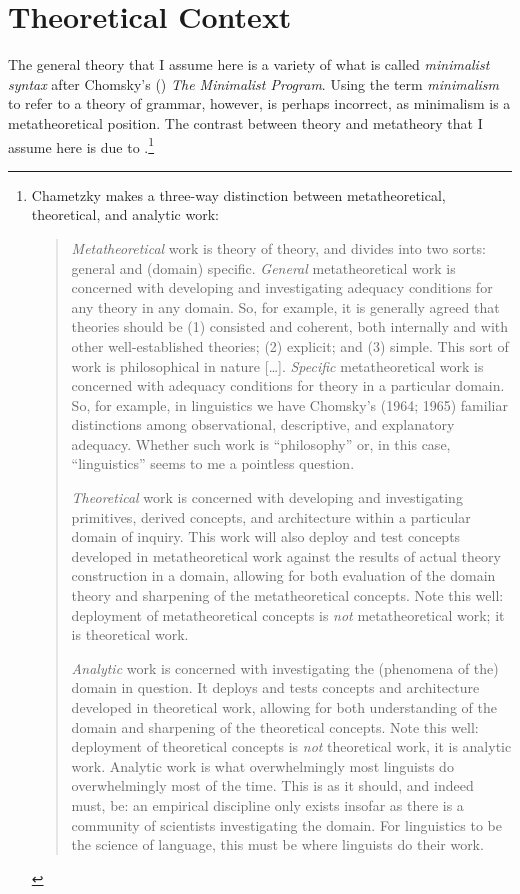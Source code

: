 \documentclass[MilwayThesis]{subfiles}
\begin{document}
\section{Theoretical Context}\label{sec:standard}
The general theory that I assume here is a variety of what is called \textit{minimalist syntax} after Chomsky's (\citeyear{chomsky1995minimalist}) \textit{The Minimalist Program}.
Using the term \textit{minimalism} to refer to a theory of grammar, however, is perhaps incorrect, as minimalism is a metatheoretical position.
The contrast between theory and metatheory that I assume here is due to \textcite{chametzky1996theory}.\footnote{
	Chametzky makes a three-way distinction between metatheoretical, theoretical, and analytic work:
	\begin{quote}
		\textit{Metatheoretical} work is theory of theory, and divides into two sorts: general and (domain) specific.
		\textit{General} metatheoretical work is concerned with developing and investigating adequacy conditions for any theory in any domain.
		So, for example, it is generally agreed that theories should be (1) consisted and coherent, both internally and with other well-established theories; (2) explicit; and (3) simple. This sort of work is philosophical in nature [\ldots].
		\textit{Specific} metatheoretical work is concerned with adequacy conditions for theory in a particular domain.
		So, for example, in linguistics	we have Chomsky's (1964; 1965) familiar distinctions among observational, descriptive, and explanatory adequacy.
		Whether such work is ``philosophy'' or, in this case, ``linguistics'' seems to me a pointless question.
		
		\textit{Theoretical} work is concerned with developing and investigating primitives, derived concepts, and architecture within a particular domain of inquiry. 
		This work will also deploy and test concepts developed in metatheoretical work against the results of actual theory construction in a domain, allowing for both evaluation of the domain theory and sharpening of the metatheoretical concepts. 
		Note this well: deployment of metatheoretical concepts is \textit{not} metatheoretical work; it is theoretical work.
		
		\textit{Analytic} work is concerned with investigating the (phenomena of the) domain in question.
		It deploys and tests concepts and architecture developed in theoretical work, allowing for both understanding of the domain and sharpening of the theoretical concepts. 
		Note this well: deployment of theoretical concepts is \textit{not} theoretical work, it is analytic work. 
		Analytic work is what overwhelmingly most linguists do overwhelmingly most of the time.
		This is as it should, and indeed must, be: an empirical discipline only exists insofar as there is a community of scientists investigating the domain.
		For linguistics to be the science of language, this must be where linguists do their work.
		\parencite[xvii\textit{ff}]{chametzky1996theory}
	\end{quote}
	}
\end{document}
